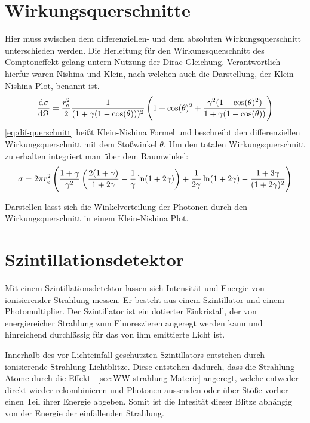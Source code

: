 \documentclass[11pt, ngerman, fleqn, DIV=15, headinclude, BCOR=2cm]{scrreprt}
\begin{document}
\section{Wirkungsquerschnitte}
Hier muss zwischen dem differenziellen- und dem absoluten Wirkungsquerschnitt
unterschieden werden.
Die Herleitung für den Wirkungsquerschnitt des Comptoneffekt gelang untern
Nutzung der Dirac-Gleichung. Verantwortlich hierfür waren Nishina und
Klein, nach welchen auch die Darstellung, der Klein-Nishina-Plot, benannt ist.
\[
    \dod \sigma\Omega = \frac{r^2_\text{e}}{2}
    \frac{1}{(1+\gamma(1-\cos(\theta)))^2}\del{1+\cos(\theta)^2+\frac{\gamma^2(1-\cos(\theta)^2)}{1+\gamma(1-\cos(\theta))}}
\]
\label{eq:dif-querschnitt}
\ref{eq:dif-querschnitt} heißt Klein-Nishina Formel und beschreibt den
differenziellen Wirkungsquerschnitt mit dem Stoßwinkel $\theta$.
Um den totalen Wirkungsquerschnitt zu erhalten integriert man über dem
Raumwinkel:
\[
    \sigma = 2\pi r^2_e
    \del{\frac{1+\gamma}{\gamma^2}\del{\frac{2(1+\gamma)}{1+2\gamma}-\frac
        1\gamma\ln(1+2\gamma)}+\frac
    1{2\gamma}\ln(1+2\gamma)-\frac{1+3\gamma}{(1+2\gamma)^2}}
\]

Darstellen lässt sich die Winkelverteilung der Photonen durch den Wirkungsquerschnitt in einem
Klein-Nishina Plot. 

\section{Szintillationsdetektor}
Mit einem Szintillationsdetektor lassen sich Intensität und Energie von
ionisierender Strahlung messen.
Er besteht aus einem Szintillator und einem Photomultiplier.
Der Szintillator ist ein dotierter Einkristall, der von energiereicher
Strahlung zum Fluoreszieren angeregt werden kann und hinreichend
durchlässig für das von ihm emittierte Licht ist.

Innerhalb des vor Lichteinfall geschützten Szintillators entstehen durch
ionisierende Strahlung Lichtblitze. 
Diese entstehen dadurch, dass die Strahlung Atome durch die Effekt
~\ref{sec:WW-strahlung-Materie} angeregt, welche entweder direkt
wieder rekombinieren und Photonen aussenden oder über Stöße vorher einen Teil
ihrer Energie abgeben.
Somit ist die Intesität dieser Blitze abhängig von der Energie der einfallenden Strahlung.
\end{document}
